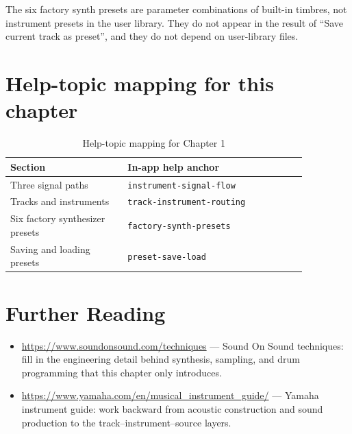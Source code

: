 The six factory synth presets are parameter combinations of built-in timbres,
not instrument presets in the user library. They do not appear in the result of
``Save current track as preset'', and they do not depend on user-library files.

\section{Help-topic mapping for this chapter}

\begin{table}[htbp]
\centering
\small
\begin{tabular}{@{}p{0.34\linewidth}p{0.52\linewidth}@{}}
\hline
Section & In-app help anchor \\
\hline
Three signal paths & \texttt{instrument-signal-flow} \\
Tracks and instruments & \texttt{track-instrument-routing} \\
Six factory synthesizer presets & \texttt{factory-synth-presets} \\
Saving and loading presets & \texttt{preset-save-load} \\
\hline
\end{tabular}
\caption{Help-topic mapping for Chapter 1}
\end{table}

\section*{Further Reading}
\begin{itemize}[leftmargin=1.5em]
\item \url{https://www.soundonsound.com/techniques} — Sound On Sound techniques: fill in the engineering detail behind synthesis, sampling, and drum programming that this chapter only introduces.
\item \url{https://www.yamaha.com/en/musical_instrument_guide/} — Yamaha instrument guide: work backward from acoustic construction and sound production to the track–instrument–source layers.
\end{itemize}
